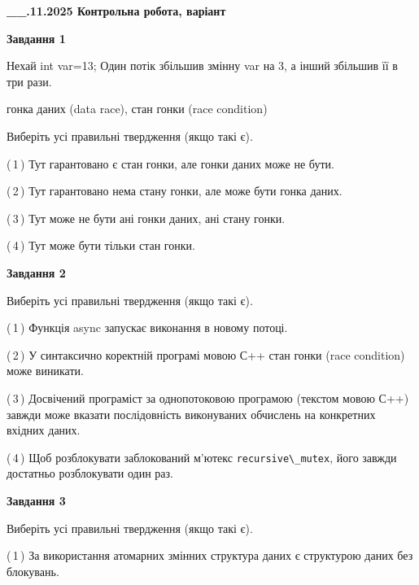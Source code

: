 \documentclass[12pt, ukrainian]{article}
\def\code#1{\Verb!#1!}
\begin{document}
\begin {large}

\textbf{\_\_.11.2025 Контрольна робота, варіант  }\par


{

\begin{center}
\textbf{Завдання 1}
\end{center}
Нехай int var=13; Один потік збільшив змінну var на 3, а інший збільшив її в три рази.

гонка даних (data race), стан гонки (race condition)

Виберіть усі правильні твердження (якщо такі є).\par
\vspace{2mm}
(\,1\,) Тут гарантовано є стан гонки, але гонки даних може не бути.%

(\,2\,) Тут гарантовано нема стану гонки, але може бути гонка даних.%

(\,3\,) Тут може не бути ані гонки даних, ані стану гонки.%

(\,4\,) Тут може бути тільки стан гонки.%



\begin{center}
\textbf{Завдання 2}
\end{center}
Виберіть усі правильні твердження (якщо такі є).\par
\vspace{2mm}

(\,1\,) Функція async запускає виконання в новому потоці.%

(\,2\,) У синтаксично коректній програмі мовою С++ стан гонки (race condition) може виникати.%

(\,3\,) Досвічений програміст за однопотоковою програмою (текстом мовою С++) завжди може вказати послідовність виконуваних обчислень на конкретних вхідних даних.%

(\,4\,) Щоб розблокувати заблокований м’ютекс \code{recursive\_mutex}, його завжди достатньо розблокувати один раз.%



\begin{center}
\textbf{Завдання 3}
\end{center}
Виберіть усі правильні твердження (якщо такі є).\par
\vspace{2mm}

(\,1\,) За використання атомарних змінних структура даних є структурою даних без блокувань.%

}
\end{large}
\end{document}
